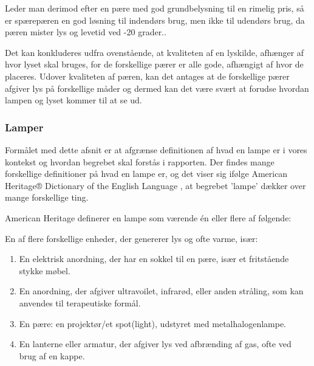 Leder man derimod efter en pære med god grundbelysning til en rimelig pris, så er spærepæren en god løsning til indendørs brug, men ikke til udendørs brug, da pæren mister lys og levetid ved -20 grader.\cite{sparepaerer}.

Det kan konkluderes udfra ovenstående, at kvaliteten af en lyskilde, afhænger af hvor lyset skal bruges, for de forskellige pærer er alle gode, afhængigt af hvor de placeres. Udover kvaliteten af pæren, kan det antages at de forskellige pærer afgiver lys på forskellige måder og dermed kan det være svært at forudse hvordan lampen og lyset kommer til at se ud.  


\subsubsection{Lamper}
Formålet med dette afsnit er at afgrænse definitionen af hvad en lampe er i vores kontekst og hvordan begrebet skal forstås i rapporten.
Der findes mange forskellige definitioner på hvad en lampe er, og det viser sig ifølge American Heritage® Dictionary of the English Language \cite{american_heritage}, at begrebet ’lampe’ dækker over mange forskellige ting. 

American Heritage definerer en lampe som værende én eller flere af følgende:

En af flere forskellige enheder, der genererer lys og ofte varme, især:
\begin{enumerate}
    \item En elektrisk anordning, der har en sokkel til en pære, især et fritstående stykke møbel.
    \item En anordning, der afgiver ultravoilet, infrarød, eller anden stråling, som kan anvendes til terapeutiske formål.
    \item En pære: en projektør/et spot(light), udstyret med metalhalogenlampe.
    \item En lanterne eller armatur, der afgiver lys ved afbrænding af gas, ofte ved brug af en kappe.
\end{enumerate}


